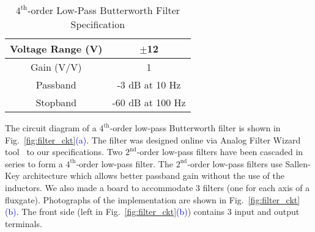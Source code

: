\begin{table} [!htb]
    \centering
    \begin{tabular} { |c|c| } 
        \hline
        Voltage Range (V) & $\pm$12\\ 
        \hline
        Gain (V/V) & 1 \\ 
        \hline
        Passband & -3 dB at 10 Hz\\ 
        \hline
        Stopband & -60 dB at 100 Hz\\
         \hline
    \end{tabular}
    \caption{$\mathrm{4^{th}}$-order Low-Pass Butterworth Filter Specification}\label{table:butter}
\end{table}

The circuit diagram of a $\mathrm{4^{th}}$-order low-pass Butterworth filter is shown in Fig.~\ref{fig:filter_ckt}\textcolor{blue}{(a)}. The filter was designed online via Analog Filter Wizard tool~\cite{fWizard} to our specifications. Two $\mathrm{2^{nd}}$-order low-pass filters have been cascaded in series to form a $\mathrm{4^{th}}$-order low-pass filter. The $\mathrm{2^{nd}}$-order low-pass filters use Sallen-Key architecture which allows better passband gain without the use of the inductors. We also made a board to accommodate 3 filters (one for each axis of a fluxgate). Photographs of the implementation are shown in Fig.~\ref{fig:filter_ckt}\textcolor{blue}{(b)}. The front side (left in Fig.~\ref{fig:filter_ckt}\textcolor{blue}{(b)}) contains 3 input and output terminals.




